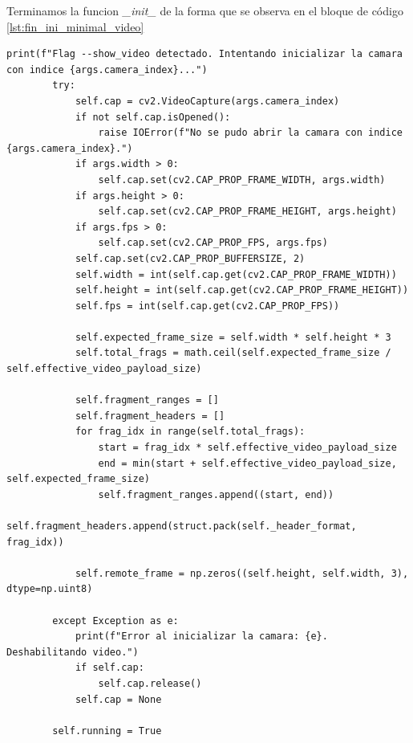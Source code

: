 Terminamos la funcion \textit{\_init\_} de la forma que se observa en el bloque de código \ref{lst:fin_ini_minimal_video}
\vspace{\baselineskip}
\begin{lstlisting}[style=pythonstyle, caption={Fin de la inicialización de Minimal\_Video}, label={lst:fin_ini_minimal_video}]
print(f"Flag --show_video detectado. Intentando inicializar la camara con indice {args.camera_index}...")
        try:
            self.cap = cv2.VideoCapture(args.camera_index)
            if not self.cap.isOpened():
                raise IOError(f"No se pudo abrir la camara con indice {args.camera_index}.")
            if args.width > 0:
                self.cap.set(cv2.CAP_PROP_FRAME_WIDTH, args.width)
            if args.height > 0:
                self.cap.set(cv2.CAP_PROP_FRAME_HEIGHT, args.height)
            if args.fps > 0:
                self.cap.set(cv2.CAP_PROP_FPS, args.fps)
            self.cap.set(cv2.CAP_PROP_BUFFERSIZE, 2)
            self.width = int(self.cap.get(cv2.CAP_PROP_FRAME_WIDTH))
            self.height = int(self.cap.get(cv2.CAP_PROP_FRAME_HEIGHT))
            self.fps = int(self.cap.get(cv2.CAP_PROP_FPS))

            self.expected_frame_size = self.width * self.height * 3
            self.total_frags = math.ceil(self.expected_frame_size / self.effective_video_payload_size)

            self.fragment_ranges = []
            self.fragment_headers = []
            for frag_idx in range(self.total_frags):
                start = frag_idx * self.effective_video_payload_size
                end = min(start + self.effective_video_payload_size, self.expected_frame_size)
                self.fragment_ranges.append((start, end))
                self.fragment_headers.append(struct.pack(self._header_format, frag_idx))

            self.remote_frame = np.zeros((self.height, self.width, 3), dtype=np.uint8)
            
        except Exception as e:
            print(f"Error al inicializar la camara: {e}. Deshabilitando video.")
            if self.cap:
                self.cap.release()
            self.cap = None

        self.running = True
\end{lstlisting}


